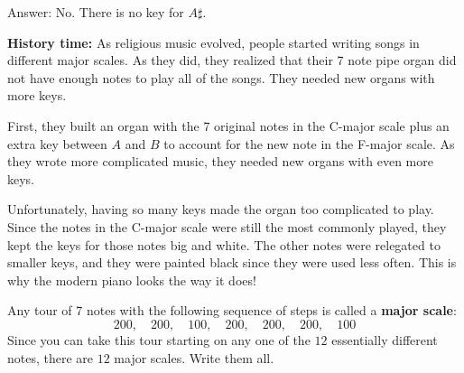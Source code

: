 \documentclass[12pt,noauthor,nooutcomes, instructornotes]{ximera}
\begin{document}
\begin{question}
\begin{enumerate}
\begin{instructorNotes}
Answer: No. There is no key for $A\sharp$.
\end{instructorNotes}

\textbf{History time:} As religious music evolved, people started writing songs in different major scales. As they did, they realized that their 7 note pipe organ did not have enough notes to play all of the songs. They needed new organs with more keys.

First, they built an organ with the 7 original notes in the C-major scale plus an extra key between $A$ and $B$ to account for the new note in the F-major scale. As they wrote more complicated music, they needed new organs with even more keys.

Unfortunately, having so many keys made the organ too complicated to play. Since the notes in the C-major scale were still the most commonly played, they kept the keys for those notes big and white. The other notes were relegated to smaller keys, and they were painted black since they were used less often. This is why the modern piano looks the way it does!

\end{enumerate}
\end{question}

\begin{question}
Any tour of 7 notes with the following sequence of steps is called a \textbf{major scale}:
\[
200, \quad 200, \quad 100,\quad 200,\quad 200,\quad 200,\quad 100
\]
Since you can take this tour starting on any one of the $12$ essentially different notes, there are $12$ major scales. Write them all.

\answerlines

\answerlines

\answerlines

\answerlines

\end{question}
\end{document}
